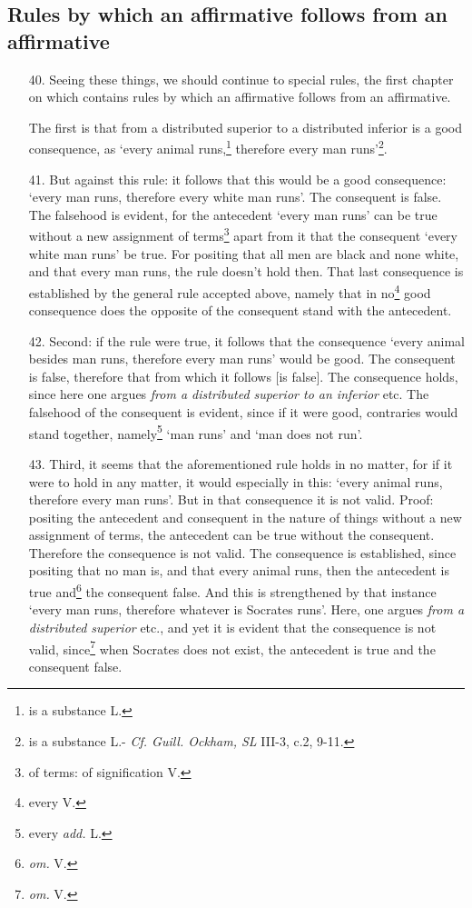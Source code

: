 \documentclass[]{article}
\begin{document}
\subsection{Rules by which an affirmative follows from an affirmative}
\begin{enumerate}
	\item[40.] Seeing these things, we should continue to special rules, the first chapter on which contains rules by which an affirmative follows from an affirmative.
	
	The first is that from a distributed superior to a distributed inferior is a good consequence, as `every animal runs,\footnote{is a substance L.} therefore every man runs'\footnote{is a substance L.- \textit{Cf. Guill. Ockham, SL} III-3, c.2, 9-11.}.
	\item[41.] But against this rule: it follows that this would be a good consequence: `every man runs, therefore every white man runs'. The consequent is false. The falsehood is evident, for the antecedent `every man runs' can be true without a new assignment of terms\footnote{of terms: of signification V.} apart from it that the consequent `every white man runs' be true. For positing that all men are black and none white, and that every man runs, the rule doesn't hold then. That last consequence is established by the general rule accepted above, namely that in no\footnote{every V.} good consequence does the opposite of the consequent stand with the antecedent.
	\item[42.] Second: if the rule were true, it follows that the consequence `every animal besides man runs, therefore every man runs' would be good. The consequent is false, therefore that from which it follows [is false]. The consequence holds, since here one argues \textit{from a distributed superior to an inferior} etc. The falsehood of the consequent is evident, since if it were good, contraries would stand together, namely\footnote{every \textit{add.} L.} `man runs' and `man does not run'.
	\item[43.] Third, it seems that the aforementioned rule holds in no matter, for if it were to hold in any matter, it would especially in this: `every animal runs, therefore every man runs'. But in that consequence it is not valid. Proof: positing the antecedent and consequent in the nature of things without a new assignment of terms, the antecedent can be true without the consequent. Therefore the consequence is not valid. The consequence is established, since positing that no man is, and that every animal runs, then the antecedent is true and\footnote{\textit{om.} V.} the consequent false. And this is strengthened by that instance `every man runs, therefore whatever is Socrates runs'. Here, one argues \textit{from a distributed superior} etc., and yet it is evident that the consequence is not valid, since\footnote{\textit{om.} V.} when Socrates does not exist, the antecedent is true and the consequent false. 

\end{enumerate}
\end{document}
